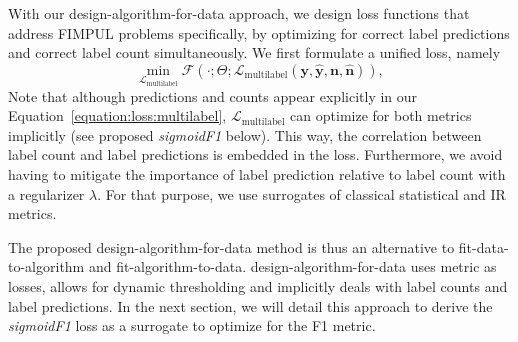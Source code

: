 With our design-algorithm-for-data approach, we design loss functions that address FIMPUL problems specifically, by optimizing for correct label predictions and correct label count simultaneously.
We first formulate a unified loss, namely
%
\begin{equation}
\label{equation:loss:multilabel}
\underset{\mathcal{L}_{\text {multilabel}}} {\min} \mathcal{F}\left(\cdot ;
\Theta; \mathcal{L}_{\text {multilabel}} (\mathbf{y}, \hat{\mathbf{y}},
\mathbf{n}, \hat{\mathbf{n}}) \right),
\end{equation}
%
Note that although predictions and counts appear explicitly in our Equation~\ref{equation:loss:multilabel},
\(\mathcal{L}_{\text {multilabel}}\) can optimize for both metrics implicitly
(see proposed \emph{sigmoidF1} below). This way, the correlation between label count and label predictions is embedded in the loss. Furthermore, we avoid having to mitigate the importance of label prediction relative to label count with a regularizer $\lambda$. For that purpose, we use surrogates of classical statistical and \ac{IR} metrics.

The proposed design-algorithm-for-data method is thus an alternative to fit-data-to-algorithm and fit-algorithm-to-data. design-algorithm-for-data uses metric as losses, allows for dynamic thresholding and implicitly deals with label counts and label predictions. In the next section, we will detail this approach to derive the \emph{sigmoidF1} loss as a surrogate to optimize for the F1 metric.


